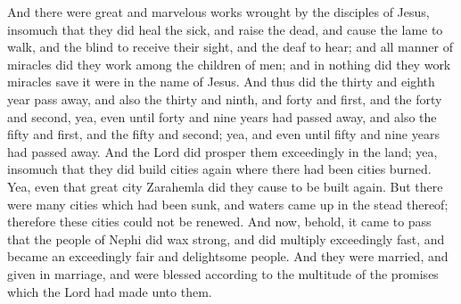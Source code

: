 And there were great and marvelous works wrought by the disciples of Jesus, insomuch that they did heal the sick, and raise the dead, and cause the lame to walk, and the blind to receive their sight, and the deaf to hear; and all manner of miracles did they work among the children of men; and in nothing did they work miracles save it were in the name of Jesus.
\bverse \iffalse And thus did the thirty and eighth year pass away, and also the thirty and ninth, and forty and first, and the forty and second, yea, even until forty and nine years had passed away, and also the fifty and first, and the fifty and second; yea, and even until fifty and nine years had passed away. \fi
And thus did the thirty and eighth year pass away, and also the thirty and ninth, and forty and first, and the forty and second, yea, even until forty and nine years had passed away, and also the fifty and first, and the fifty and second; yea, and even until fifty and nine years had passed away.
\bverse \iffalse And the Lord did prosper them exceedingly in the land; yea, insomuch that they did build cities again where there had been cities burned. \fi
And the Lord did prosper them exceedingly in the land; yea, insomuch that they did build cities again where there had been cities burned.
\bverse \iffalse Yea, even that great city Zarahemla did they cause to be built again. \fi
Yea, even that great city Zarahemla did they cause to be built again.
\bverse \iffalse But there were many cities which had been sunk, and waters came up in the stead thereof; therefore these cities could not be renewed. \fi
But there were many cities which had been sunk, and waters came up in the stead thereof; therefore these cities could not be renewed.
\bverse \iffalse And now, behold, it came to pass that the people of Nephi did wax strong, and did multiply exceedingly fast, and became an exceedingly fair and delightsome people. \fi
And now, behold, it came to pass that the people of Nephi did wax strong, and did multiply exceedingly fast, and became an exceedingly fair and delightsome people.
\bverse \iffalse And they were married, and given in marriage, and were blessed according to the multitude of the promises which the Lord had made unto them. \fi
And they were married, and given in marriage, and were blessed according to the multitude of the promises which the Lord had made unto them.
\bverse \iffalse And they did not walk any more after the performances and ordinances of the law of Moses; but they did walk after the commandments which they had received from their Lord and their God, continuing in fasting and prayer, and in meeting together oft both to pray and to hear the word of the Lord. \fi

